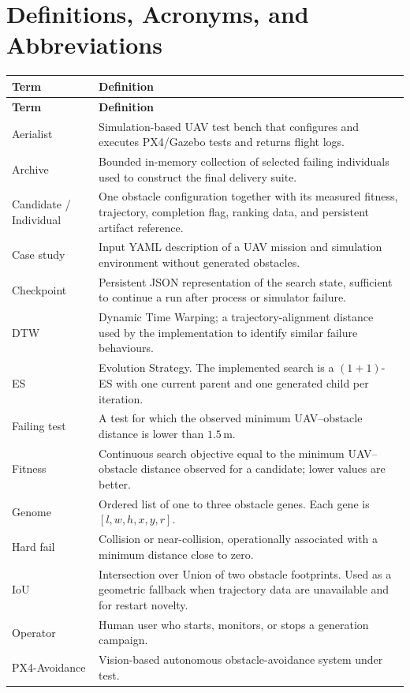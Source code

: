 \documentclass[11pt,a4paper,openany]{report}
\begin{document}
\section{Definitions, Acronyms, and Abbreviations}
\begin{longtable}{L{3.3cm} L{11.5cm}}
\toprule
\textbf{Term} & \textbf{Definition}\\
\midrule
\endfirsthead
\toprule
\textbf{Term} & \textbf{Definition}\\
\midrule
\endhead
Aerialist & Simulation-based UAV test bench that configures and executes PX4/Gazebo tests and returns flight logs.\\
Archive & Bounded in-memory collection of selected failing individuals used to construct the final delivery suite.\\
Candidate / Individual & One obstacle configuration together with its measured fitness, trajectory, completion flag, ranking data, and persistent artifact reference.\\
Case study & Input YAML description of a UAV mission and simulation environment without generated obstacles.\\
Checkpoint & Persistent JSON representation of the search state, sufficient to continue a run after process or simulator failure.\\
DTW & Dynamic Time Warping; a trajectory-alignment distance used by the implementation to identify similar failure behaviours.\\
ES & Evolution Strategy. The implemented search is a $(1+1)$-ES with one current parent and one generated child per iteration.\\
Failing test & A test for which the observed minimum UAV--obstacle distance is lower than $1.5\,\mathrm{m}$.\\
Fitness & Continuous search objective equal to the minimum UAV--obstacle distance observed for a candidate; lower values are better.\\
Genome & Ordered list of one to three obstacle genes. Each gene is $[l,w,h,x,y,r]$.\\
Hard fail & Collision or near-collision, operationally associated with a minimum distance close to zero.\\
IoU & Intersection over Union of two obstacle footprints. Used as a geometric fallback when trajectory data are unavailable and for restart novelty.\\
Operator & Human user who starts, monitors, or stops a generation campaign.\\
PX4-Avoidance & Vision-based autonomous obstacle-avoidance system under test.\\

\end{longtable}
\end{document}

